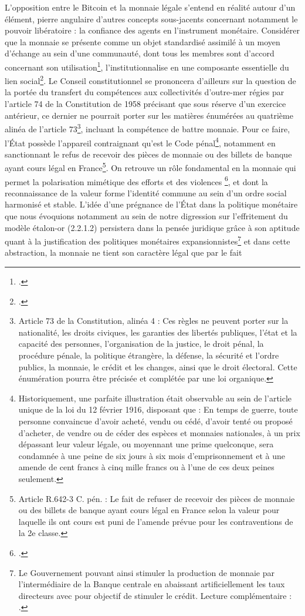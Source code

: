 {L'opposition entre le Bitcoin et la \og monnaie légale \fg{} s'entend en réalité autour d'un élément, pierre angulaire d'autres concepts sous-jacents concernant notamment le pouvoir libératoire : la confiance des agents en l'instrument monétaire. Considérer que la monnaie se présente comme un objet standardisé assimilé à un moyen d'échange au sein d'une communauté, dont tous les membres sont d'accord concernant son utilisation\footnote{.}, l'institutionnalise en une composante essentielle du lien social\footnote{.}. Le Conseil constitutionnel se prononcera d'ailleurs sur la question de la portée du transfert du compétences aux collectivités d'outre-mer régies par l'article 74 de la Constitution de 1958 précisant que sous réserve d'un exercice antérieur, ce dernier ne pourrait porter sur les matières énumérées au quatrième alinéa de l'article 73\footnote{Article 73 de la Constitution, alinéa 4 : \og Ces règles ne peuvent porter sur la nationalité, les droits civiques, les garanties des libertés publiques, l'état et la capacité des personnes, l'organisation de la justice, le droit pénal, la procédure pénale, la politique étrangère, la défense, la sécurité et l'ordre publics, la monnaie, le crédit et les changes, ainsi que le droit électoral. Cette énumération pourra être précisée et complétée par une loi organique\fg{}.}, incluant la compétence de battre monnaie. Pour ce faire, l'État possède l'appareil contraignant qu'est le Code pénal\footnote{Historiquement, une parfaite illustration était observable au sein de l'article unique de la loi du 12 février 1916, disposant que : \og En temps de guerre, toute personne convaincue d'avoir acheté, vendu ou cédé, d'avoir tenté ou proposé d'acheter, de vendre ou de céder des espèces et monnaies nationales, à un prix dépassant leur valeur légale, ou moyennant une prime quelconque, sera condamnée à une peine de six jours à six mois d'emprisonnement et à une amende de cent francs à cinq mille francs ou à l'une de ces deux peines seulement\fg{}.}, notamment en sanctionnant le refus de recevoir des pièces de monnaie ou des billets de banque ayant cours légal en France\footnote{Article R.642-3 C. pén. : Le fait de refuser de recevoir des pièces de monnaie ou des billets de banque ayant cours légal en France selon la valeur pour laquelle ils ont cours est puni de l'amende prévue pour les contraventions de la 2e classe.}. On retrouve un rôle fondamental en la monnaie qui permet la \og polarisation mimétique des efforts et des violences \fg{}\footnote{.}, et dont la reconnaissance de la valeur forme l'identité commune au sein d'un ordre social harmonisé et stable. L'idée d'une prégnance de l'État dans la politique monétaire que nous évoquions notamment au sein de notre digression sur l'effritement du modèle étalon-or (2.2.1.2) persistera dans la pensée juridique grâce à son aptitude quant à la justification des politiques monétaires expansionnistes\footnote{Le Gouvernement pouvant ainsi stimuler la production de monnaie par l'intermédiaire de la Banque centrale en abaissant artificiellement les taux directeurs avec pour objectif de stimuler le crédit. Lecture complémentaire : .} et dans cette abstraction, la monnaie ne tient son caractère légal que par le fait }
